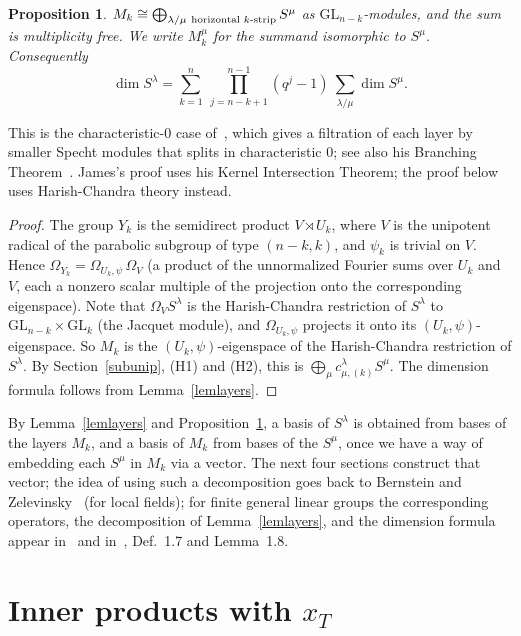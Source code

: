 \documentclass[11pt, letterpaper]{amsart}
\let\amstext\text
\renewcommand{\text}[1]{\amstext{\upshape #1}}%
\newtheorem{proposition}{Proposition}
\theoremstyle{definition}
\theoremstyle{remark}
\newcommand{\GL}{\mathrm{GL}}
\begin{document}
\begin{proposition}\label{proplayer}
$M_k\cong\bigoplus_{\lambda/\mu\ \text{horizontal $k$-strip}}S^\mu$ as $\GL_{n-k}$-modules, and the sum is multiplicity free. We write $M_k^\mu$ for the summand isomorphic to $S^\mu$. Consequently
\[
\dim S^\lambda=\sum_{k=1}^n\ \prod_{j=n-k+1}^{n-1}(q^j-1)\ \sum_{\lambda/\mu}\dim S^\mu .
\]
\end{proposition}
This is the characteristic-$0$ case of~\cite[Thm.~16.9]{James84}, which gives a filtration of each layer by smaller Specht modules that splits in characteristic $0$; see also his Branching Theorem~\cite[Thm.~16.10]{James84}. James's proof uses his Kernel Intersection Theorem; the proof below uses Harish-Chandra theory instead.
\begin{proof}
The group $Y_k$ is the semidirect product $V\rtimes U_k$, where $V$ is the unipotent radical of the parabolic subgroup of type $(n-k,k)$, and $\psi_k$ is trivial on $V$. Hence $\Omega_{Y_k}=\Omega_{U_k,\psi}\,\Omega_V$ (a product of the unnormalized Fourier sums over $U_k$ and $V$, each a nonzero scalar multiple of the projection onto the corresponding eigenspace). Note that $\Omega_VS^\lambda$ is the Harish-Chandra restriction of $S^\lambda$ to $\GL_{n-k}\times\GL_k$ (the Jacquet module), and $\Omega_{U_k,\psi}$ projects it onto its $(U_k,\psi)$-eigenspace. So $M_k$ is the $(U_k,\psi)$-eigenspace of the Harish-Chandra restriction of $S^\lambda$. By Section~\ref{subunip}, (H1) and (H2), this is $\bigoplus_\mu c^\lambda_{\mu,(k)}S^\mu$. The dimension formula follows from Lemma~\ref{lemlayers}.
\end{proof}

By Lemma~\ref{lemlayers} and Proposition~\ref{proplayer}, a basis of $S^\lambda$ is obtained from bases of the layers $M_k$, and a basis of $M_k$ from bases of the $S^\mu$, once we have a way of embedding each $S^\mu$ in $M_k$ via a vector. The next four sections construct that vector; the idea of using such a decomposition goes back to Bernstein and Zelevinsky~\cite{BZ,BZ2} (for local fields); for finite general linear groups the corresponding operators, the decomposition of Lemma~\ref{lemlayers}, and the dimension formula appear in~\cite[Thm.~9.11, Cor.~10.16, Thm.~10.21]{James84} and in~\cite{Jam86}, Def.~1.7 and Lemma~1.8.

\section{Inner products with \texorpdfstring{$x_T$}{xT}}\label{secinner}
\end{document}

